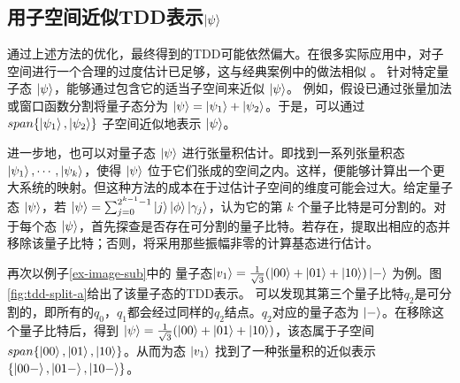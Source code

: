 \subsection*{用子空间近似TDD表示$\ket{\psi}$}
通过上述方法的优化，最终得到的TDD可能依然偏大。在很多实际应用中，对子空间进行一个合理的过度估计已足够，这与经典案例中的做法相似 \citep{Cho_1996,lin2014parallel,Wang+farside_iccad03}。
针对特定量子态 $\ket{\psi}$，能够通过包含它的适当子空间来近似 $\ket{\psi}$。
例如，假设已通过张量加法或窗口函数分割将量子态分为 $\ket{\psi} = \ket{\psi_1}+\ket{\psi_2}$。于是，可以通过 $span\{\ket{\psi_1},\ket{\psi_2}\}$ 子空间近似地表示 $\ket{\psi}$。

进一步地，也可以对量子态 $\ket{\psi}$ 进行张量积估计。即找到一系列张量积态 $\ket{\psi_1},\cdots, \ket{\psi_k}$，使得 $\ket{\psi}$ 位于它们张成的空间之内。这样，便能够计算出一个更大系统的映射。但这种方法的成本在于过估计子空间的维度可能会过大。给定量子态 $\ket{\psi}$，若 $\ket{\psi}=\sum_{j=0}^{2^{k-1}-1}{\ket{j}\ket{\phi}\ket{\gamma_j}}$，认为它的第 $k$ 个量子比特是可分割的。对于每个态 $\ket{\psi}$，首先探查是否存在可分割的量子比特。若存在，提取出相应的态并移除该量子比特；否则，将采用那些振幅非零的计算基态进行估计。
\begin{example}
    \label{ex-approx}
    再次以例子\ref{ex-image-sub}中的
    量子态$\ket{v_1}=\frac{1}{\sqrt{3}}(\ket{00}+\ket{01}+\ket{10})\ket{-}$ 为例。图 \ref{fig:tdd-split-a}给出了该量子态的TDD表示。
可以发现其第三个量子比特$q_2$是可分割的，即所有的$q_0$，$q_1$都会经过同样的$q_2$结点。$q_2$对应的量子态为 $\ket{-}$。在移除这个量子比特后，得到 $\ket{\psi}=\frac{1}{\sqrt{3}}(\ket{00}+\ket{01}+\ket{10})$，该态属于子空间 $span\{\ket{00},\ket{01},\ket{10}\}$。从而为态 $\ket{v_1}$ 找到了一种张量积的近似表示 $\{\ket{00-},\ket{01-},\ket{10-}\}$。
\end{example}

